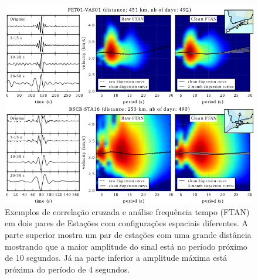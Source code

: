 \begin{figure}[!ht]
\centering
\includegraphics[scale=0.8]{Figs/fonte_FTAN.png}
\caption[Exemplos de correlação cruzada e análise tempo/frequência (FTAN) em dois pares de Estações com configurações espaciais diferentes.]{Exemplos de correlação cruzada e análise frequência tempo (FTAN) em dois pares de Estações com configurações espaciais diferentes. A parte superior mostra um par de estações com uma grande distância mostrando que a maior amplitude do sinal está no período próximo de 10 segundos. Já na parte inferior a amplitude máxima está próxima do período de 4 segundos.}
\label{fonte_FTAN}
\end{figure}

